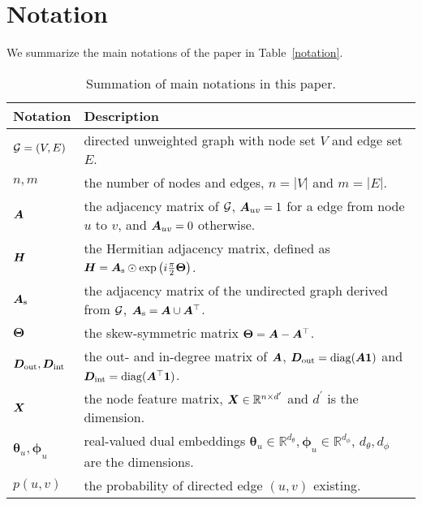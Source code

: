 \section{Notation}\label{app_notation}
We summarize the main notations of the paper in Table~\ref{notation}.
\begin{table}[th]
\centering

\caption{Summation of main notations in this paper.}\label{tbl:def-notation}
\begin{tabular} {l|p{5.0in}} \hline
\toprule
{\bf Notation} &  {\bf Description}  \\ \midrule
${\mathcal{G}}=(V,E)$ & directed unweighted graph with node set $V$ and edge set $E$. \\ \midrule
$n, m$ & the number of nodes and edges, $n = |V|$ and $m = |E|$. \\ \midrule

${\bm{A}}$ & the adjacency matrix of ${\mathcal{G}}$, ${\bm{A}}_{uv} = 1$ for a edge from node $u$ to $v$, and ${\bm{A}}_{uv} = 0$ otherwise. \\ \midrule

 ${\bm{H}}$ & the Hermitian adjacency matrix, defined as ${\bm{H}} = {\bm{A}}_{\rm s} \odot \exp\left(i\frac{\pi}{2}\mathbf{\Theta}\right)$. \\ \midrule

${\bm{A}}_{\rm s}$ & the  adjacency matrix of the undirected graph derived from ${\mathcal{G}}$, ${\bm{A}}_{\rm s} = {\bm{A}} \cup {\bm{A}}^{\top}$. \\ \midrule

$\mathbf{\Theta}$ & the skew-symmetric matrix $\mathbf{\Theta} = {\bm{A}} - {\bm{A}}^{\top}$. \\ \midrule

${\bm{D}}_{\rm out}, {\bm{D}}_{\rm int}$ & the out- and in-degree matrix of ${\bm{A}}$, ${\bm{D}}_{\rm out} = {\rm diag}({\bm{A}}{\bm{1}}) $ and ${\bm{D}}_{\rm int} = {\rm diag}({\bm{A}}^{\top}{\bm{1}})$. \\ \midrule

${\bm{X}}$ & the node feature matrix, ${\bm{X}} \in \mathbb{R}^{n \times d^{\prime}}$ and $d^{\prime}$ is the dimension. \\ \midrule

$\bm{\theta}_u, \bm{\phi}_u$ & real-valued dual embeddings $\bm{\theta}_u\in \mathbb{R}^{d_\theta}, \bm{\phi}_u\in \mathbb{R}^{d_\phi}$, $d_\theta, d_\phi$ are the dimensions. \\ \midrule

$p(u,v)$ & the probability of directed edge $(u,v)$ existing. \\ \midrule


\end{tabular}
\end{table}
